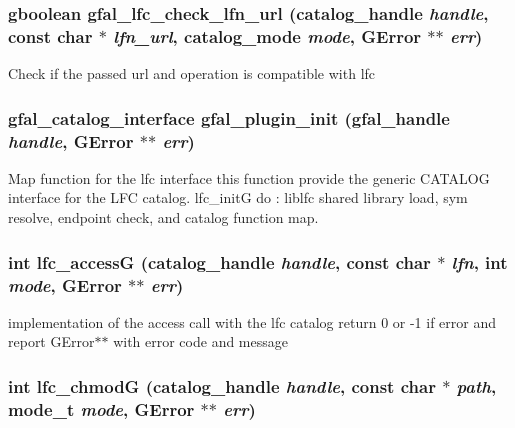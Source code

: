 \subsubsection{\setlength{\rightskip}{0pt plus 5cm}gboolean gfal\_\-lfc\_\-check\_\-lfn\_\-url (catalog\_\-handle {\em handle}, const char $\ast$ {\em lfn\_\-url}, catalog\_\-mode {\em mode}, GError $\ast$$\ast$ {\em err})}\label{gfal__common__lfc_8c_8baa624b528deb15ff4ee61fa9948ac8}


Check if the passed url and operation is compatible with lfc 
\subsubsection{\setlength{\rightskip}{0pt plus 5cm}\bf{gfal\_\-catalog\_\-interface} gfal\_\-plugin\_\-init (gfal\_\-handle {\em handle}, GError $\ast$$\ast$ {\em err})}\label{gfal__common__lfc_8c_5c9edde4d67d96432a319d940a4799f1}


Map function for the lfc interface this function provide the generic CATALOG interface for the LFC catalog. lfc\_\-init\-G do : liblfc shared library load, sym resolve, endpoint check, and catalog function map. 
\subsubsection{\setlength{\rightskip}{0pt plus 5cm}int lfc\_\-access\-G (catalog\_\-handle {\em handle}, const char $\ast$ {\em lfn}, int {\em mode}, GError $\ast$$\ast$ {\em err})}\label{gfal__common__lfc_8c_c5d7bae3ad9aea9f912d6b91f8d5731e}


implementation of the access call with the lfc catalog return 0 or -1 if error and report GError$\ast$$\ast$ with error code and message 
\subsubsection{\setlength{\rightskip}{0pt plus 5cm}int lfc\_\-chmod\-G (catalog\_\-handle {\em handle}, const char $\ast$ {\em path}, mode\_\-t {\em mode}, GError $\ast$$\ast$ {\em err})}\label{gfal__common__lfc_8c_f40927feaad58de76b5406eb828102a6}


